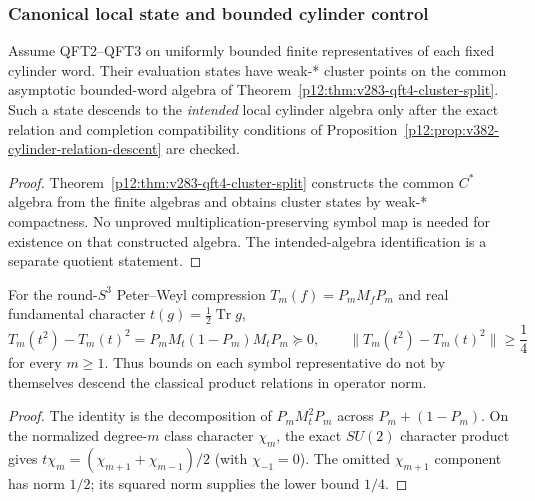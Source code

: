 \documentclass[12pt,a4paper]{article}
\begin{document}
\subsubsection{Canonical local state and bounded cylinder control}
\label{p12:sec:canonical-local-state-bounded-control}

\begin{proposition}
\label{p12:prop:subsequential-states}
Assume QFT2--QFT3 on uniformly bounded finite representatives of each
fixed cylinder word. Their evaluation states have weak-* cluster points
on the common asymptotic bounded-word algebra of
Theorem~\ref{p12:thm:v283-qft4-cluster-split}.
Such a state descends to the \emph{intended} local cylinder algebra
only after the exact relation and completion compatibility conditions
of Proposition~\ref{p12:prop:v382-cylinder-relation-descent} are checked.
\end{proposition}
\begin{proof}
Theorem~\ref{p12:thm:v283-qft4-cluster-split} constructs the common
$C^*$ algebra from the finite algebras and obtains cluster states by
weak-* compactness. No unproved multiplication-preserving symbol map is
needed for existence on that constructed algebra. The intended-algebra
identification is a separate quotient statement.
\end{proof}



\begin{proposition}
\label{p12:prop:v382-toeplitz-product-obstruction}
For the round-$S^3$ Peter--Weyl compression $T_m(f)=P_mM_fP_m$
and real fundamental character $t(g)=\frac12\operatorname{Tr}g$,
\[
 T_m(t^2)-T_m(t)^2=P_mM_t(1-P_m)M_tP_m\succeq0,
 \qquad\|T_m(t^2)-T_m(t)^2\|\ge\frac14
\]
for every $m\ge1$. Thus bounds on each symbol representative do not by
themselves descend the classical product relations in operator norm.
\end{proposition}
\begin{proof}
The identity is the decomposition of $P_mM_t^2P_m$ across
$P_m+(1-P_m)$. On the normalized degree-$m$ class character $\chi_m$, the exact
$SU(2)$ character product gives
$t\chi_m=(\chi_{m+1}+\chi_{m-1})/2$ (with $\chi_{-1}=0$).
The omitted $\chi_{m+1}$ component has norm $1/2$; its squared
norm supplies the lower bound $1/4$.
\end{proof}
\end{document}
